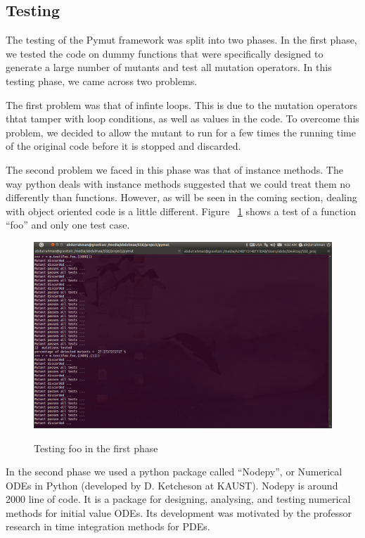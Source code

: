 \documentclass{acm_proc_article-sp}
\begin{document}
\subsection{Testing}

The testing of the Pymut framework was split into two phases. In the first phase, we tested the code on dummy functions that were specifically designed to generate a large number of mutants and test all mutation operators. In this testing phase, we came across two problems.

The first problem was that of infinte loops. This is due to the mutation operators thtat tamper with loop conditions, as well as values in the code. To overcome this problem, we decided to allow the mutant to run for a few times the running time of the original code before it is stopped and discarded.

The second problem we faced in this phase was that of instance methods. The way python deals with instance methods suggested that we could treat them no differently than functions. However, as will be seen in the coming section, dealing with object oriented code is a little different. Figure ~\ref{sh} shows a test of a function ``foo'' and only one test case.

\begin{figure}[h]
\caption{Testing foo in the first phase}
\includegraphics[trim = 0cm 11.3cm 25cm 1.9cm, clip, scale=0.4]{600.png}
\label{sh}
\end{figure}

In the second phase we used a python package called ``Nodepy'', or Numerical ODEs in Python (developed by D. Ketcheson at KAUST). Nodepy is around 2000 line of code. It is a package for designing, analysing, and testing numerical methods for initial value ODEs. Its development was motivated by the professor research in time integration methods for PDEs.\cite{a5}
\end{document}
